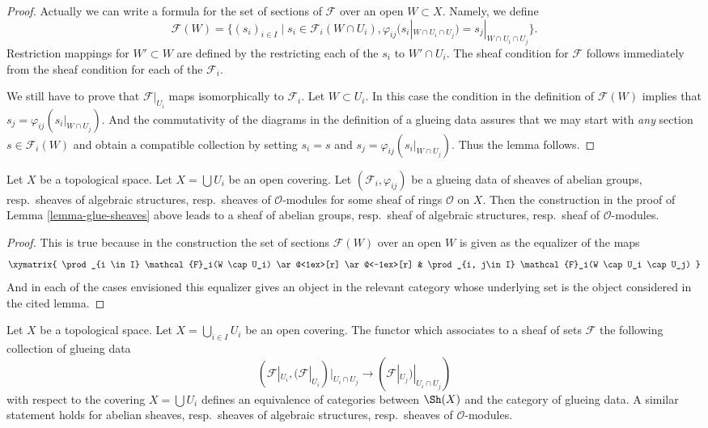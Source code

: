 \begin{proof}
Actually we can write a formula for the set of sections
of $\mathcal{F}$ over an open $W \subset X$. Namely, we define
$$
\mathcal{F}(W) =
\{
(s_i)_{i \in I} \mid
s_i \in \mathcal{F}_i(W \cap U_i),
\varphi_{ij}(s_i|_{W \cap U_i \cap U_j}) = s_j|_{W \cap U_i \cap U_j}
\}.
$$
Restriction mappings for $W' \subset W$ are defined by the restricting
each of the $s_i$ to $W' \cap U_i$. The sheaf condition for $\mathcal{F}$
follows immediately from the sheaf condition for each of the
$\mathcal{F}_i$.

\medskip\noindent
We still have to prove that $\mathcal{F}|_{U_i}$ maps
isomorphically to $\mathcal{F}_i$. Let $W \subset U_i$.
In this case the condition in the definition of
$\mathcal{F}(W)$ implies that $s_j = \varphi_{ij}(s_i|_{W \cap U_j})$.
And the commutativity of the diagrams in the definition
of a glueing data assures that we may start with {\it any}
section $s \in \mathcal{F}_i(W)$ and obtain a compatible
collection by setting $s_i = s$ and $s_j = \varphi_{ij}(s_i|_{W \cap U_j})$.
Thus the lemma follows.
\end{proof}

\begin{lemma}
\label{lemma-glue-sheaves-structures}
Let $X$ be a topological space.
Let $X = \bigcup U_i$ be an open covering.
Let $(\mathcal{F}_i, \varphi_{ij})$ be a glueing data
of sheaves of abelian groups, resp.\ sheaves of algebraic structures,
resp.\ sheaves of $\mathcal{O}$-modules for some sheaf of rings
$\mathcal{O}$ on $X$. Then the construction in the proof of
Lemma \ref{lemma-glue-sheaves} above leads to a sheaf
of abelian groups, resp.\ sheaf of algebraic structures,
resp.\ sheaf of $\mathcal{O}$-modules.
\end{lemma}

\begin{proof}
This is true because in the construction the set of sections
$\mathcal{F}(W)$ over an open $W$ is given as the
equalizer of the maps
$$
\xymatrix{
\prod_{i \in I} \mathcal{F}_i(W \cap U_i)
\ar@<1ex>[r]
\ar@<-1ex>[r]
&
\prod_{i, j\in I} \mathcal{F}_i(W \cap U_i \cap U_j)
}
$$
And in each of the cases envisioned this equalizer gives
an object in the relevant category whose underlying set is
the object considered in the cited lemma.
\end{proof}

\begin{lemma}
\label{lemma-mapping-property-glue}
Let $X$ be a topological space.
Let $X = \bigcup_{i\in I} U_i$ be an open covering.
The functor which associates to a sheaf of
sets $\mathcal{F}$ the following collection of
glueing data
$$
(\mathcal{F}|_{U_i},
(\mathcal{F}|_{U_i})|_{U_i \cap U_j}
\to
(\mathcal{F}|_{U_j})|_{U_i \cap U_j}
)
$$
with respect to the covering $X = \bigcup U_i$
defines an equivalence of categories between
$\Sh(X)$ and the category of glueing
data. A similar statement holds for
abelian sheaves, resp.\ sheaves of algebraic structures,
resp.\ sheaves of $\mathcal{O}$-modules.
\end{lemma}


